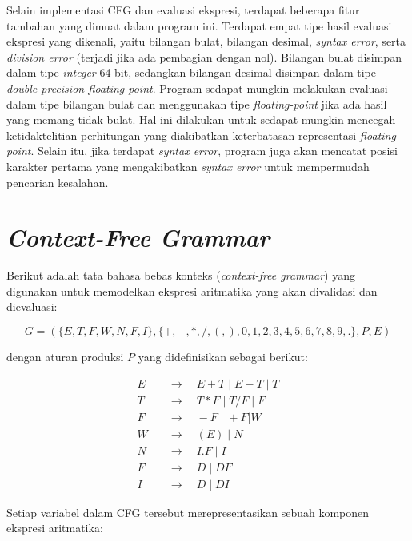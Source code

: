 \documentclass[a4paper,titlepage]{article}
\begin{document}
		Selain implementasi CFG dan evaluasi ekspresi, terdapat beberapa fitur tambahan yang dimuat dalam program ini. Terdapat empat tipe hasil evaluasi ekspresi yang dikenali, yaitu bilangan bulat, bilangan desimal, \textit{syntax error}, serta \textit{division error} (terjadi jika ada pembagian dengan nol). Bilangan bulat disimpan dalam tipe \textit{integer} 64-bit, sedangkan bilangan desimal disimpan dalam tipe \textit{double-precision floating point}. Program sedapat mungkin melakukan evaluasi dalam tipe bilangan bulat dan menggunakan tipe \textit{floating-point} jika ada hasil yang memang tidak bulat. Hal ini dilakukan untuk sedapat mungkin mencegah ketidaktelitian perhitungan yang diakibatkan keterbatasan representasi \textit{floating-point}. Selain itu, jika terdapat \textit{syntax error}, program juga akan mencatat posisi karakter pertama yang mengakibatkan \textit{syntax error} untuk mempermudah pencarian kesalahan.

	\section{\textit{Context-Free Grammar}}

		Berikut adalah tata bahasa bebas konteks (\textit{context-free grammar}) yang digunakan untuk memodelkan ekspresi aritmatika yang akan divalidasi dan dievaluasi:

		\[G = (\{E, T, F, W, N, F, I\}, \{+, -, *, /, (, ), 0, 1, 2, 3, 4, 5, 6, 7, 8, 9, .\}, P, E)\]

		dengan aturan produksi $P$ yang didefinisikan sebagai berikut:

		\begin{align*}
			E \quad & \rightarrow \quad E+T \; | \; E-T \; | \; T \\
			T \quad & \rightarrow \quad T*F \; | \; T/F \; | \; F \\
			F \quad & \rightarrow \quad -F \; | \; +F | W \\
			W \quad & \rightarrow \quad (E) \; | \; N \\
			N \quad & \rightarrow \quad I.F \; | \; I \\
			F \quad & \rightarrow \quad D \; | \; DF \\
			I \quad & \rightarrow \quad D \; | \; DI
		\end{align*}

		Setiap variabel dalam CFG tersebut merepresentasikan sebuah komponen ekspresi aritmatika:
\end{document}
